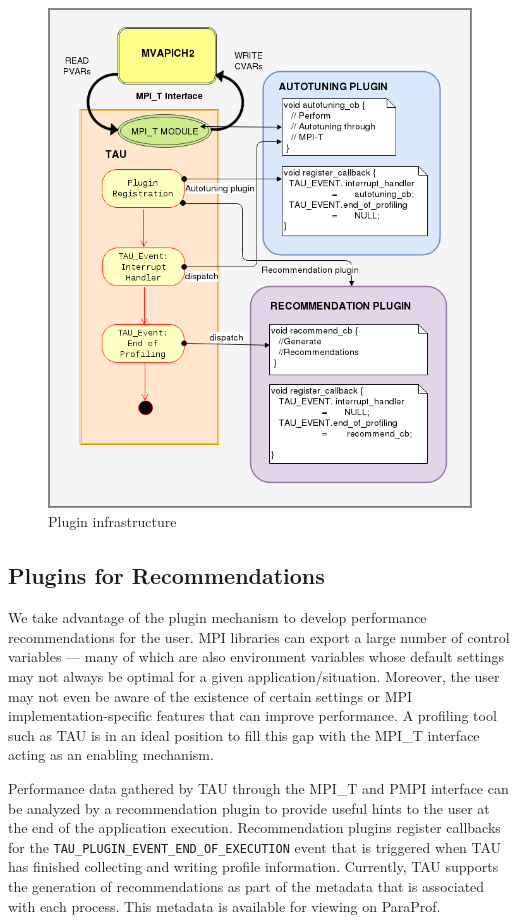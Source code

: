 \begin{center}
        \begin{figure}[tbp!]
         \centering
                \includegraphics[scale=0.5,width=\columnwidth,keepaspectratio]{figures/Plugin_Infrastructure}
                \caption{Plugin infrastructure}
                \label{fig:plugininfrastructure}
        \end{figure}
\end{center}

\subsection{Plugins for Recommendations}
We take advantage of the plugin mechanism to develop performance recommendations for the user. MPI libraries can export a large number of control variables --- many of which are also environment variables whose default settings may not always be optimal for a given application/situation. Moreover, the user may not even be aware of the existence of certain settings or MPI implementation-specific features that can improve performance. A profiling tool such as TAU is in an ideal position to fill this gap with the MPI\_T interface acting as an enabling mechanism. \par Performance data gathered by TAU through the MPI\_T and PMPI interface can be analyzed by a recommendation plugin to provide useful hints to the user at the end of the application execution. Recommendation plugins register callbacks for the \verb+TAU_PLUGIN_EVENT_END_OF_EXECUTION+ event that is triggered when TAU has finished collecting and writing profile information. Currently, TAU supports the generation of recommendations as part of the metadata that is associated with each process. This metadata is available for viewing on ParaProf.


